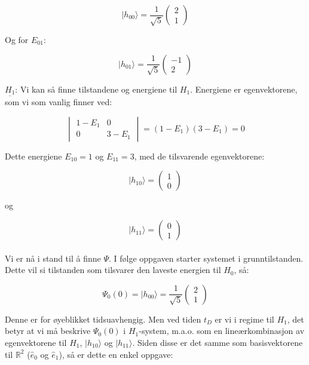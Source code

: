 \documentclass[a4paper,norsk, 10pt]{article}
\numberwithin{equation}{section}
\begin{document}
\begin{equation}
|h_{00}\rangle = \frac{1}{\sqrt{5}}
\begin{pmatrix}
2\\ 1
\end{pmatrix}
\label{eq:h00}
\end{equation}

Og for $E_{01}$:

\begin{equation}
|h_{01}\rangle = \frac{1}{\sqrt{5}}
\begin{pmatrix}
-1\\ 2
\end{pmatrix}
\label{eq:h01}
\end{equation}

\textbf{$\underline{H_1}$}: Vi kan så finne tilstandene og energiene til $H_1$. Energiene er egenvektorene, som vi som vanlig finner ved:

$$
\begin{vmatrix}
1-E_1 & 0\\
0 & 3-E_1
\end{vmatrix}
= (1-E_1)(3-E_1) = 0
$$

Dette energiene $E_{10} = 1$ og $E_{11} = 3$, med de tilsvarende egenvektorene:

\begin{equation}
|h_{10}\rangle = 
\begin{pmatrix}
1\\0
\end{pmatrix}
\label{eq:h10}
\end{equation}

og 

\begin{equation}
|h_{11}\rangle = 
\begin{pmatrix}
0\\1
\end{pmatrix}
\label{eq:h11}
\end{equation}\\

Vi er nå i stand til å finne $\Psi$. I følge oppgaven starter systemet i grunntilstanden. Dette vil si tilstanden som tilsvarer den laveste energien til $H_0$, så:

$$
\Psi_0(0) = |h_{00}\rangle = \frac{1}{\sqrt{5}}
\begin{pmatrix}
2\\1
\end{pmatrix}
$$

Denne er for øyeblikket tidsuavhengig. Men ved tiden $t_D$ er vi i regime til $H_1$, det betyr at vi må beskrive $\Psi_0(0)$ i $H_1$-system, m.a.o. som en lineærkombinasjon av egenvektorene til $H_1$, $|h_{10}\rangle$ og $|h_{11}\rangle$. Siden disse er det samme som basisvektorene til $\mathbb{R}^2$ ($\hat{e}_0$ og $\hat{e}_1$), så er dette en enkel oppgave:
\end{document}
